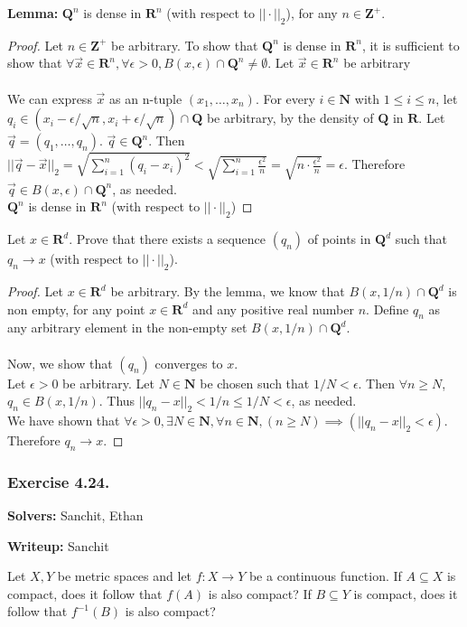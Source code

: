 \documentclass{article}
\newcommand{\Z}{\mathbf{Z}}
\newcommand{\N}{\mathbf{N}}
\newcommand{\R}{\mathbf{R}}
\newcommand{\Q}{\mathbf{Q}}
\theoremstyle{plain} %
\numberwithin{thm}{section} %
\theoremstyle{definition}
\begin{document}
    \bigskip
    \noindent \textbf{Lemma:} $\Q^n$ is dense in $\R^n$ (with respect to $||\cdot||_2$), for any $n\in\Z^+$.
    \begin{proof}
        Let $n\in\Z^+$ be arbitrary. To show that $\Q^n$ is dense in $\R^n$, it is sufficient to show that $\forall \vec{x}\in \R^n, \forall \epsilon>0, B(x, \epsilon)\cap\Q^n\neq\emptyset$. Let $\vec{x}\in\R^n$ be arbitrary\\\\
        We can express $\vec{x}$ as an n-tuple $(x_1,\ldots,x_n)$. For every $i\in\N$ with $1\leq i\leq n$, let $q_i\in (x_i-\epsilon/\sqrt{n}, x_i+\epsilon/\sqrt{n})\cap\Q$ be arbitrary, by the density of $\Q$ in $\R$. Let $\vec{q} = (q_1,\ldots,q_n)$. $\vec{q}\in\Q^n$. Then $||\vec{q}-\vec{x}||_2 = \sqrt{\sum_{i=1}^n (q_i-x_i)^2} < \sqrt{\sum_{i=1}^n \frac{\epsilon^2}{n}} = \sqrt{n\cdot\frac{\epsilon^2}{n}}=\epsilon$. Therefore $\vec{q}\in B(x,\epsilon)\cap\Q^n$, as needed.\\
        $\Q^n$ is dense in $\R^n$ (with respect to $||\cdot||_2$)
    \end{proof}
    Let $x\in\R^d$. Prove that there exists a sequence $(q_n)$ of points in $\Q^d$ such that $q_n\to x$ (with respect to $||\cdot||_2$).
    \begin{proof}
        Let $x\in\R^d$ be arbitrary. By the lemma, we know that $B(x,1/n)\cap\Q^d$ is non empty, for any point $x\in\R^d$ and any positive real number $n$. Define $q_n$ as any arbitrary element in the non-empty set $B(x,1/n)\cap\Q^d$.\\\\
        Now, we show that $(q_n)$ converges to $x$.\\
        Let $\epsilon>0$ be arbitrary. Let $N\in \N$ be chosen such that $1/N<\epsilon$. Then $\forall n\geq N$, $q_n\in B(x,1/n)$. Thus $||q_n - x||_2<1/n\leq 1/N< \epsilon$, as needed.\\
        We have shown that $\forall\epsilon>0,\exists N\in\N, \forall n\in\N, (n\geq N)\implies(||q_n-x||_2<\epsilon)$. Therefore $q_n\to x$.
    \end{proof}

    \subsubsection{Exercise 4.24.}

    \textbf{Solvers:} Sanchit, Ethan

    \textbf{Writeup:} Sanchit

    Let $X,Y$ be metric spaces and let $f:X\rightarrow Y$ be a continuous function. If $A\subseteq X$ is compact, does it follow that $f(A)$ is also compact? If $B\subseteq Y$ is compact, does it follow that $f^{-1}(B)$ is also compact?
\end{document}
